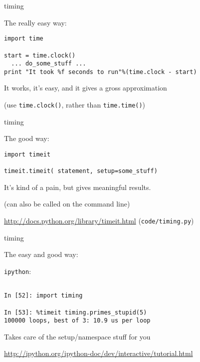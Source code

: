 \documentclass{beamer}
\begin{document}
\begin{frame}[fragile]{timing}

{\Large The really easy way:}

\begin{verbatim}
import time

start = time.clock()
  ... do_some_stuff ...
print "It took %f seconds to run"%(time.clock - start)
\end{verbatim}

{\Large It works, it's easy, and it gives a gross approximation}

\vfill
(use \verb|time.clock()|, rather than \verb|time.time()|)

\end{frame} 

\begin{frame}[fragile]{timing}

{\Large The good way:}

\begin{verbatim}
import timeit

timeit.timeit( statement, setup=some_stuff)

\end{verbatim}

{\Large It's kind of a pain, but gives meaningful results.}

(can also be called on the command line)

\vfill
\url{http://docs.python.org/library/timeit.html}
\vfill
(\verb|code/timing.py|)
\end{frame} 

\begin{frame}[fragile]{timing}

{\Large The easy and good way:}

\vfill
{\LARGE \verb|ipython|:}
\begin{verbatim}

In [52]: import timing

In [53]: %timeit timing.primes_stupid(5)
100000 loops, best of 3: 10.9 us per loop

\end{verbatim}

{\Large Takes care of the setup/namespace stuff for you}

\vfill
\url{http://ipython.org/ipython-doc/dev/interactive/tutorial.html}
\end{frame} 
\end{document}
